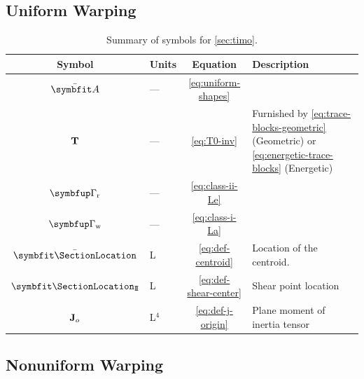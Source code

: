 \subsection*{Uniform Warping} 

\begin{table}[H]
    \centering
    \caption{Summary of symbols for \cref{sec:timo}.}
    \begin{tabular}{clcl}
        \toprule
        Symbol & Units & Equation & Description \\ \midrule
        \(\EnhanShapes\) & --- & \eqref{eq:uniform-shapes} & \\
        \(\mathbf{T}\) & --- & \eqref{eq:T0-inv} & Furnished by \eqref{eq:trace-blocks-geometric} (Geometric) or \eqref{eq:energetic-trace-blocks} (Energetic) \\
        \(\RigidShift\) & --- & \eqref{eq:class-ii-Le} \\
        \(\ShapeShift\) & --- & \eqref{eq:class-i-La} \\
        \(\CentroidLocation\) & L & \eqref{eq:def-centroid} & Location of the centroid. \\
        \(\CenterShearLocation\) & L & \eqref{eq:def-shear-center} & Shear point location \\
        \(\mathbf{J}_{o}\) & L$^4$ & \eqref{eq:def-j-origin} & Plane moment of inertia tensor \\
    \bottomrule
    \end{tabular}
    \label{tab:uniform-notation}
\end{table}

\subsection*{Nonuniform Warping} 



